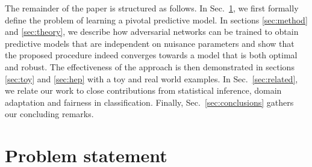 \documentclass[twocolumn,superscriptaddress,aps]{revtex4-1}
\theoremstyle{plain}
\begin{document}
The remainder of the paper is structured as follows. In Sec.~\ref{sec:problem},
we first formally define the problem of learning a pivotal predictive model. In
sections \ref{sec:method} and \ref{sec:theory}, we describe how adversarial
networks can be trained to obtain predictive models that are independent on
nuisance parameters and show that the proposed procedure indeed converges
towards a model that is both optimal and robust. The  effectiveness of the
approach is then demonstrated in sections \ref{sec:toy} and \ref{sec:hep} with a
toy and real world examples. In Sec.~\ref{sec:related}, we relate our work
to close contributions from statistical inference, domain adaptation
and fairness in classification. Finally, Sec.~\ref{sec:conclusions} gathers
our concluding remarks.



\section{Problem statement}
\label{sec:problem}
%
%
\end{document}
